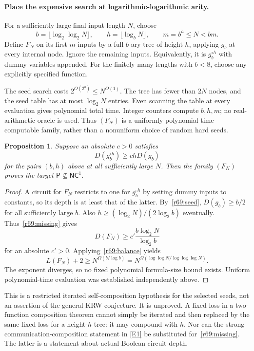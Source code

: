 \documentclass[11pt,a4paper]{article}
\newcommand{\eref}[2]{\hyperlink{extra:#1:#2}{[E#2]}}
\newtheorem{notebookproposition}[notebooklemma]{Proposition}
\numberwithin{equation}{section}
\begin{document}
\paragraph{Place the expensive search at logarithmic-logarithmic arity.}
For a sufficiently large final input length $N$, choose
\[
 b=\lfloor\log_2\log_2N\rfloor,\qquad
 h=\lfloor\log_b N\rfloor,
 \qquad m=b^h\le N<bm.
\]
Define $F_N$ on its first $m$ inputs by a full $b$-ary tree of height $h$, applying $g_b$ at every internal node. Ignore the remaining inputs. Equivalently, it is $g_b^{\circ h}$ with dummy variables appended. For the finitely many lengths with $b<8$, choose any explicitly specified function.

The seed search costs $2^{O(2^b)}\le N^{O(1)}$. The tree has fewer than $2N$ nodes, and the seed table has at most $\log_2N$ entries. Even scanning the table at every evaluation gives polynomial total time. Integer counters compute $b,h,m$; no real-arithmetic oracle is used. Thus $(F_N)$ is a uniformly polynomial-time computable family, rather than a nonuniform choice of random hard seeds.

\begin{notebookproposition}\label{r69:conditional}
Suppose an absolute $c>0$ satisfies
\begin{equation}\label{r69:missing}
 D(g_b^{\circ h})\ge c h D(g_b)
\end{equation}
for the pairs $(b,h)$ above at all sufficiently large $N$. Then the family $(F_N)$ proves the target $\mathsf P\nsubseteq\mathsf{NC}^1$.
\end{notebookproposition}
\begin{proof}
A circuit for $F_N$ restricts to one for $g_b^{\circ h}$ by setting dummy inputs to constants, so its depth is at least that of the latter. By~\eqref{r69:seed}, $D(g_b)\ge b/2$ for all sufficiently large $b$. Also $h\ge(\log_2N)/(2\log_2b)$ eventually. Thus~\eqref{r69:missing} gives
\[
 D(F_N)\ge c'\frac{b\log_2N}{\log_2b}
\]
for an absolute $c'>0$. Applying~\eqref{r69:balance} yields
\begin{equation}\label{r69:lower}
 L(F_N)+2\ge
 N^{\Omega(b/\log b)}
 =N^{\Omega(\log\log N/\log\log\log N)}.
\end{equation}
The exponent diverges, so no fixed polynomial formula-size bound exists. Uniform polynomial-time evaluation was established independently above.
\end{proof}

This is a restricted iterated self-composition hypothesis for the selected seeds, not an assertion of the general KRW conjecture. It is unproved. A fixed loss in a two-function composition theorem cannot simply be iterated and then replaced by the same fixed loss for a height-$h$ tree: it may compound with $h$. Nor can the strong communication-composition statement in \eref{statement}{1} be substituted for~\eqref{r69:missing}. The latter is a statement about actual Boolean circuit depth.
\end{document}
